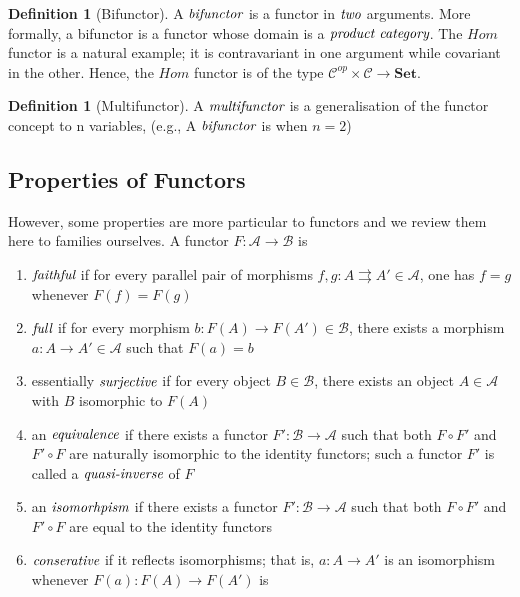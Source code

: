 \documentclass[10pt, oneside, reqno]{amsart}
\theoremstyle{plain}%
\theoremstyle{definition}
\newtheorem{defn}[thm]{Definition}
\theoremstyle{remark}
\begin{document}
\begin{defn}[Bifunctor]
 A $\emph{bifunctor}$ is a functor in $\emph{two}$ arguments. More formally, a bifunctor is a functor whose
 domain is a $\emph{product category}$.
 The $Hom$ functor is a natural example; it is contravariant in one argument while covariant in the other.
 Hence, the $Hom$ functor is of the type $\mathcal{C}^{op} \times \mathcal{C} \to \textbf{Set}$.
\end{defn}

\begin{defn}[Multifunctor]
 A $\emph{multifunctor}$ is a generalisation of the functor concept to n variables, (e.g., A $\emph{bifunctor}$ is when $n=2$)
\end{defn}

\subsection{Properties of Functors} %
\label{subsec:functorsproperties}
However, some properties are more particular to functors and we review them here to families ourselves.
A functor $F : \mathcal{A} \to \mathcal{B}$ is
\begin{enumerate}
 \item $\emph{faithful}$ if for every parallel pair of morphisms $f,g : A \rightrightarrows A' \in \mathcal{A}$, one has $f = g$ whenever $F(f) = F(g)$
 \item $\emph{full}$ if for every morphism $b: F(A) \to F(A') \in \mathcal{B}$, there exists a morphism $a: A \to A' \in \mathcal{A}$ such that $F(a) = b$
 \item essentially $\emph{surjective}$ if for every object $B \in \mathcal{B}$, there exists an object $A \in \mathcal{A}$ with $B$ isomorphic to $F(A)$
 \item an $\emph{equivalence}$ if there exists a functor $F': \mathcal{B} \to \mathcal{A}$ such that both $F \circ F'$ and $F' \circ F$ are naturally
 isomorphic to the identity functors; such a functor $F'$ is called a $\emph{quasi-inverse}$ of $F$
 \item an $\emph{isomorhpism}$ if there exists a functor $F': \mathcal{B} \to \mathcal{A}$ such that both $F \circ F'$ and $F' \circ F$
 are equal to the identity functors
 \item $\emph{conserative}$ if it reflects isomorphisms; that is, $a: A \to A'$ is an isomorphism whenever $F(a): F(A) \to F(A')$ is
\end{enumerate}
\end{document}
